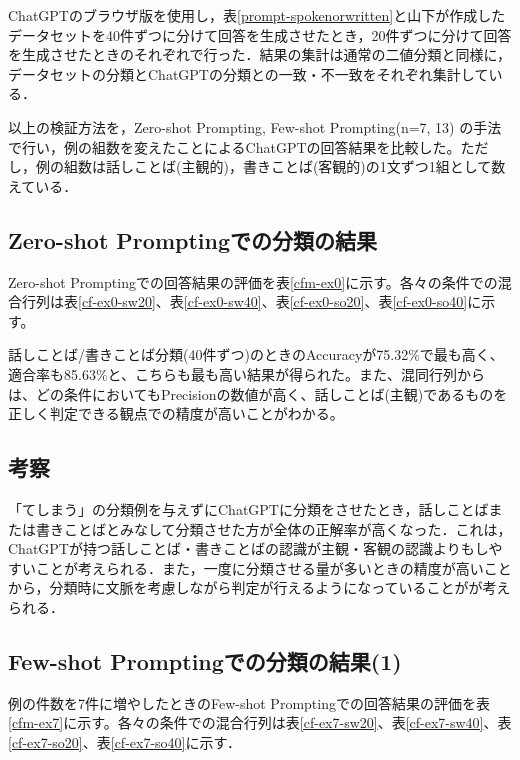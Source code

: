 ChatGPTのブラウザ版を使用し，表\ref{prompt-spokenorwritten}と山下が作成したデータセットを40件ずつに分けて回答を生成させたとき，20件ずつに分けて回答を生成させたときのそれぞれで行った．結果の集計は通常の二値分類と同様に，データセットの分類とChatGPTの分類との一致・不一致をそれぞれ集計している．

以上の検証方法を，Zero-shot Prompting, Few-shot Prompting(n=7, 13) の手法で行い，例の組数を変えたことによるChatGPTの回答結果を比較した。ただし，例の組数は話しことば(主観的)，書きことば(客観的)の1文ずつ1組として数えている．

\subsection{Zero-shot Promptingでの分類の結果 \label{c6s1-1}}
Zero-shot Promptingでの回答結果の評価を表\ref{cfm-ex0}に示す。各々の条件での混合行列は表\ref{cf-ex0-sw20}、表\ref{cf-ex0-sw40}、表\ref{cf-ex0-so20}、表\ref{cf-ex0-so40}に示す。







話しことば/書きことば分類(40件ずつ)のときのAccuracyが75.32\%で最も高く、適合率も85.63\%と、こちらも最も高い結果が得られた。また、混同行列からは、どの条件においてもPrecisionの数値が高く、話しことば(主観)であるものを正しく判定できる観点での精度が高いことがわかる。

\subsection{考察}
「てしまう」の分類例を与えずにChatGPTに分類をさせたとき，話しことばまたは書きことばとみなして分類させた方が全体の正解率が高くなった．これは，ChatGPTが持つ話しことば・書きことばの認識が主観・客観の認識よりもしやすいことが考えられる．また，一度に分類させる量が多いときの精度が高いことから，分類時に文脈を考慮しながら判定が行えるようになっていることがが考えられる．

\subsection{Few-shot Promptingでの分類の結果(1) \label{c6s1-2}}
例の件数を7件に増やしたときのFew-shot Promptingでの回答結果の評価を表\ref{cfm-ex7}に示す。各々の条件での混合行列は表\ref{cf-ex7-sw20}、表\ref{cf-ex7-sw40}、表\ref{cf-ex7-so20}、表\ref{cf-ex7-so40}に示す．







